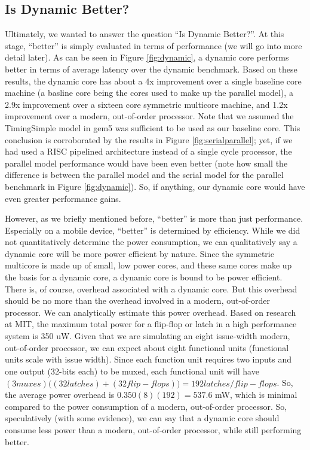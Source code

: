 \subsection{Is Dynamic Better?}
Ultimately, we wanted to answer the question ``Is Dynamic Better?''. At this stage, ``better'' is simply evaluated in terms of performance (we will go into more detail later). As can be seen in Figure \ref{fig:dynamic}, a dynamic core performs better in terms of average latency over the dynamic benchmark. Based on these results, the dynamic core has about a 4x improvement over a single baseline core machine (a basline core being the cores used to make up the parallel model), a 2.9x improvement over a sixteen core symmetric multicore machine, and 1.2x improvement over a modern, out-of-order processor. Note that we assumed the TimingSimple model in gem5 was sufficient to be used as our baseline core. This conclusion is corroborated by the results in Figure \ref{fig:serialparallel}; yet, if we had used a RISC pipelined architecture instead of a single cycle processor, the parallel model performance would have been even better (note how small the difference is between the parallel model and the serial model for the parallel benchmark in Figure \ref{fig:dynamic}). So, if anything, our dynamic core would have even greater performance gains.

However, as we briefly mentioned before, ``better'' is more than just performance. Especially on a mobile device, ``better'' is determined by efficiency. While we did not quantitatively determine the power consumption, we can qualitatively say a dynamic core will be more power efficient by nature. Since the symmetric multicore is made up of small, low power cores, and these same cores make up the basis for a dynamic core, a dynamic core is bound to be power efficient. There is, of course, overhead associated with a dynamic core. But this overhead should be no more than the overhead involved in a modern, out-of-order processor. We can analytically estimate this power overhead. Based on research at MIT, the maximum total power for a flip-flop or latch in a high performance system is 350 uW. Given that we are simulating an eight issue-width modern, out-of-order processor, we can expect about eight functional units (functional units scale with issue width). Since each function unit requires two inputs and one output (32-bits each) to be muxed, each functional unit will have $(3 muxes) \dot ((32 latches) + (32 flip-flops)) = 192 latches/flip-flops$. So, the average power overhead is $0.350(8)(192) = 537.6$ mW, which is minimal compared to the power consumption of a modern, out-of-order processor. So, speculatively (with some evidence), we can say that a dynamic core should consume less power than a modern, out-of-order processor, while still performing better.

